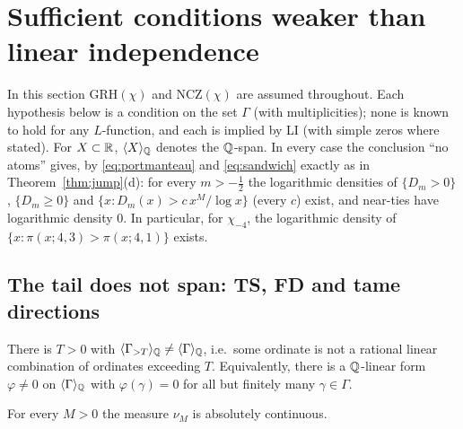 \section{Sufficient conditions weaker than linear independence}\label{sec:sufficient}

In this section GRH$(\chi)$ and NCZ$(\chi)$ are assumed throughout. Each hypothesis below is a condition on the set $\Gamma$ (with multiplicities); none is known to hold for any $L$-function, and each is implied by LI (with simple zeros where stated). For $X\subset\mathbb R$, $\langle X\rangle_{\mathbb Q}$ denotes the $\mathbb Q$-span. In every case the conclusion ``no atoms'' gives, by \eqref{eq:portmanteau} and \eqref{eq:sandwich} exactly as in Theorem~\ref{thm:jump}(d): for every $m>-\frac12$ the logarithmic densities of $\{D_m>0\}$, $\{D_m\ge0\}$ and $\{x:D_m(x)>c\,x^M/\log x\}$ (every $c$) exist, and near-ties have logarithmic density $0$. In particular, for $\chi_{-4}$, the logarithmic density of $\{x:\pi(x;4,3)>\pi(x;4,1)\}$ exists.

\subsection{The tail does not span: TS, FD and tame directions}\label{sec:TS}

\begin{hypothesis}[TS]
There is $T>0$ with $\langle\Gamma_{>T}\rangle_{\mathbb Q}\ne\langle\Gamma\rangle_{\mathbb Q}$, i.e.\ some ordinate is not a rational linear combination of ordinates exceeding $T$. Equivalently, there is a $\mathbb Q$-linear form $\varphi\ne0$ on $\langle\Gamma\rangle_{\mathbb Q}$ with $\varphi(\gamma)=0$ for all but finitely many $\gamma\in\Gamma$.
\end{hypothesis}

\begin{theorem}\label{thm:TS}
For every $M>0$ the measure $\nu_M$ is absolutely continuous.
\end{theorem}

